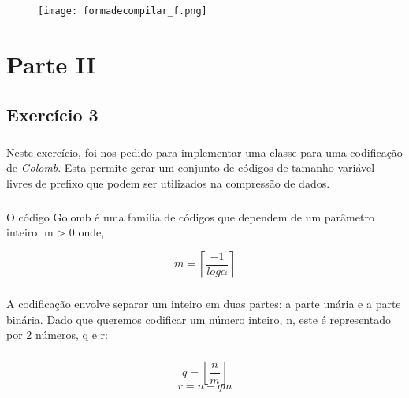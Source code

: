 \documentclass{report}
\begin{document}
\begin{enumerate}
    \paragraph{}
    \begin{figure}[h!]
    \centering
    \texttt{[image: formadecompilar\_f.png]}
    \label{fig:compile}
    \end{figure}

    \end{enumerate}
 
\chapter{Parte II}
\label{chap.ParteII}
\section{Exercício 3}
\paragraph{}
Neste exercício, foi nos pedido para implementar uma classe para uma codificação de \textit{Golomb}. Esta permite gerar um conjunto de códigos de tamanho variável livres de prefixo que podem ser utilizados na compressão de dados. \paragraph{}
O código Golomb é uma família de códigos que dependem de um parâmetro inteiro, m > 0 onde,

\begin{equation}
    m = \left\lceil\dfrac{-1}{log \alpha}\right\rceil
\end{equation}
\paragraph{}

A codificação envolve separar um inteiro em duas partes: a parte unária e a parte binária. 
Dado que queremos codificar um número inteiro, n, este é representado por 2 números, q e r: \paragraph{}
\begin{equation}
    q = \left\lfloor\dfrac{n}{m}\right\rfloor
\end{equation}
\begin{equation}
    r = n - qm  
\end{equation}
\end{document}
